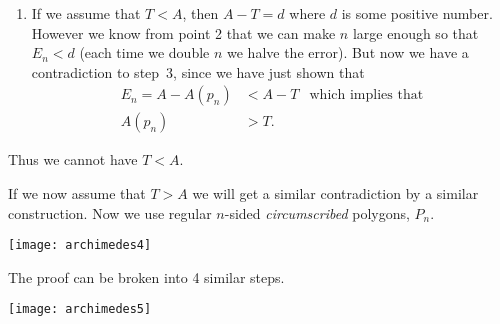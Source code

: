 \begin{enumerate}
\item If we assume that $T<A$, then $A-T = d$ where $d$ is some positive number.
However we know from point 2 that we can make $n$ large enough so that $E_n < d$
(each time we double $n$ we halve the error). But now we have a contradiction to
step~3, since we have just shown that
\begin{align*}
  E_n = A-A(p_n) & < A-T & \text{which implies that}\\
  A(p_n) & > T.
\end{align*}
\end{enumerate}
Thus we cannot have $T<A$.

If we now assume that $T>A$ we will get a similar contradiction by a similar
construction. Now we use regular $n$-sided \emph{circumscribed} polygons, $P_n$.
\begin{center}
 \texttt{[image: archimedes4]}
\end{center}
The proof can be broken into 4 similar steps.
\begin{center}
 \texttt{[image: archimedes5]}
\end{center}
